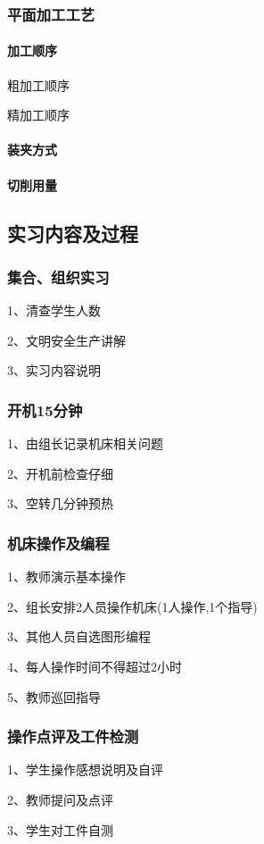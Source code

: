 \subsubsection{平面加工工艺}
\paragraph{加工顺序}
粗加工顺序

精加工顺序
\paragraph{装夹方式}

\paragraph{切削用量}


\subsection{实习内容及过程}

\subsubsection{集合、组织实习}
1、清查学生人数

2、文明安全生产讲解

3、实习内容说明
\subsubsection{开机15分钟}
1、由组长记录机床相关问题

2、开机前检查仔细

3、空转几分钟预热
\subsubsection{机床操作及编程}
1、教师演示基本操作

2、组长安排2人员操作机床(1人操作,1个指导)

3、其他人员自选图形编程

4、每人操作时间不得超过2小时

5、教师巡回指导
\subsubsection{操作点评及工件检测}
1、学生操作感想说明及自评

2、教师提问及点评

3、学生对工件自测

